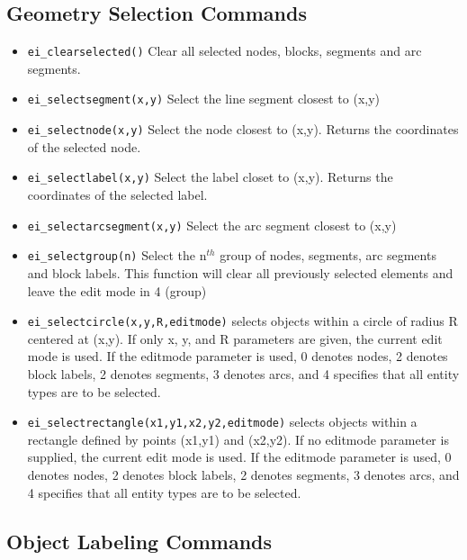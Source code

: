 \subsection{Geometry Selection Commands}

\begin{itemize}
\item {\tt ei\_clearselected()} Clear all selected nodes, blocks, segments and arc
segments.

\item {\tt ei\_selectsegment(x,y)} Select the line segment closest to (x,y)

\item {\tt ei\_selectnode(x,y)} Select the node closest to (x,y).
Returns the coordinates of the selected node.

\item {\tt ei\_selectlabel(x,y)} Select the label closet to (x,y).
Returns the coordinates of the selected label.

\item {\tt ei\_selectarcsegment(x,y)} Select the arc segment closest to (x,y)

\item {\tt ei\_selectgroup(n)} Select the n$^{th}$ group of nodes, segments, arc
segments and block labels. This function will clear all previously selected
elements and leave the edit mode in 4 (group)

\item{\tt ei\_selectcircle(x,y,R,editmode)} selects objects within a circle of radius
R centered at (x,y).  If only x, y, and R parameters are given, the current
edit mode is used.  If the editmode parameter is used, 0 denotes nodes, 2
denotes block labels, 2 denotes segments, 3 denotes arcs, and 4 specifies
that all entity types are to be selected.

\item{\tt ei\_selectrectangle(x1,y1,x2,y2,editmode)} selects objects within a rectangle
defined by points (x1,y1) and (x2,y2). If no editmode parameter is supplied,
the current edit mode is used.  If the editmode parameter is used, 0 denotes
nodes, 2 denotes block labels, 2 denotes segments, 3 denotes arcs, and 4 
specifies that all entity types are to be selected.
\end{itemize}


\subsection{Object Labeling Commands}

